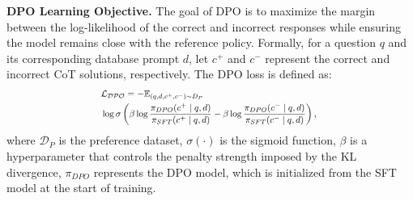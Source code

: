 


\textbf{DPO Learning Objective.}
The goal of DPO is to maximize the margin between the log-likelihood of the correct and incorrect responses while ensuring the model remains close with the reference policy. Formally, for a question $q$ and its corresponding database prompt $d$, let $c^{+}$ and $c^{-}$ represent the correct and incorrect CoT solutions, respectively. The DPO loss is defined as: 
\begin{equation*}
\scalebox{0.8}{$
\begin{aligned}
&\mathcal{L_{DPO}} = - \mathbb{E}_{(q,d,c^{+},c^{-}) \sim D_{P}} \\
&\log \sigma\left(\beta \log\frac{\pi_{DPO}(c^{+}\mid q,d)}{\pi_{SFT}(c^{+}\mid q,d)} -\beta\log\frac{\pi_{DPO}(c^{-} \mid q,d)}{\pi_{SFT}(c^{-}\mid q,d)}\right),
\end{aligned}$
}
\end{equation*}
where $\mathcal{D}_{P}$ is the preference dataset, $\sigma(\cdot)$ is the sigmoid function, $\beta$ is a hyperparameter that controls the penalty strength imposed by the KL divergence, $\pi_{DPO}$ represents the DPO model, which is initialized from the SFT model at the start of training.

